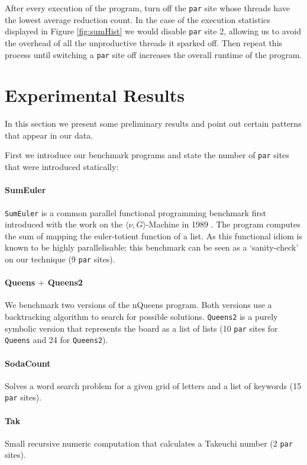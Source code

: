 After every execution of the program, turn off the \verb'par' site whose threads
have the lowest average reduction count. In the case of the execution statistics
displayed in Figure \ref{fig:sumHist} we would disable \verb-par- site 2, allowing
us to avoid the overhead of all the unproductive threads it sparked off.  Then
repeat this process until switching a \verb'par' site off increases the overall
runtime of the program.

\section{Experimental Results}
\label{sec:results}

In this section we present some preliminary results and point out certain patterns
that appear in our data. 

First we introduce our benchmark programs and state the number of \verb-par-
sites that were introduced statically:

\paragraph{SumEuler}
\texttt{SumEuler} is a common parallel functional programming benchmark first introduced
with the work on the $\langle\nu, G\rangle$-Machine in 1989 \citep{vGMachine}.
The program computes the sum of mapping the euler-totient function of a list. As
this functional idiom is known to be highly parallelisable; this benchmark can
be seen as a `sanity-check' on our technique (9 \verb-par- sites).

\paragraph{Queens $+$ Queens2}
We benchmark two versions of the nQueens program. Both versions use a backtracking
algorithm to search for possible solutions. \texttt{Queens2} is a purely symbolic version
that represents the board as a list of lists (10 \verb-par- sites for \texttt{Queens} and
24 for \texttt{Queens2}).

\paragraph{SodaCount}
Solves a word search problem for a given grid of letters and a list of keywords
(15 \verb-par- sites).

\paragraph{Tak}
Small recursive numeric computation that calculates a Takeuchi number (2 \verb-par- sites).

